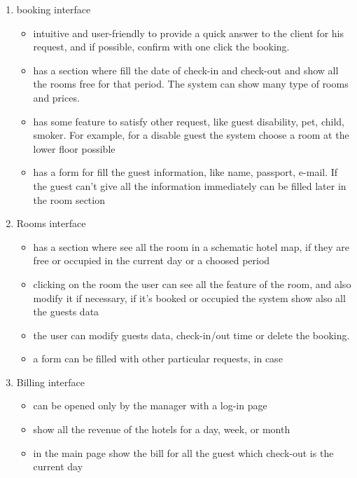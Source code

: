 \begin{enumerate}
	
\item booking interface
    \begin{itemize}
		\item intuitive and user-friendly to provide a quick answer to the client for his request, and if possible, confirm with one click the booking.
		\item has a section where fill the date of check-in and check-out and show all the rooms free for that period. The system can show many type of rooms and prices.
		\item has some feature to satisfy other request, like guest disability, pet, child, smoker. For example, for a disable guest the system choose a room at the lower floor possible
		\item has a form for fill the guest information, like name, passport, e-mail. If the guest can't give all the information immediately can be filled later in the room section
    \end{itemize}
	
\item Rooms interface
    \begin{itemize}
		\item has a section where see all the room in a schematic hotel map, if they are free or occupied in the current day or a choosed period
		\item clicking on the room the user can see all the feature of the room, and also modify it if necessary, if it's booked or occupied the system show also all the guests data
		\item the user can modify guests data, check-in/out time or delete the booking. 
		\item a form can be filled with other particular requests, in case
    \end{itemize}

\item Billing interface
    \begin{itemize}
		\item can be opened only by the manager with a log-in page
		\item show all the revenue of the hotels for a day, week, or month
		\item in the main page show the bill for all the guest which check-out is the current day
    \end{itemize}

\end{enumerate}

